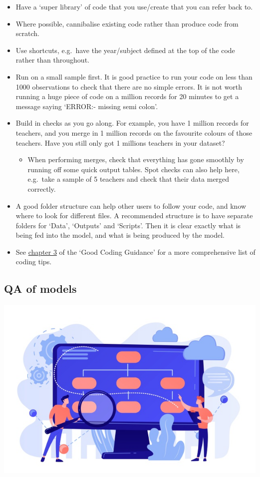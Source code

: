 \documentclass[
]{article}
\providecommand{\tightlist}{%
  \setlength{\itemsep}{0pt}\setlength{\parskip}{0pt}}
\begin{document}
\begin{itemize}
\item
  Have a `super library' of code that you use/create that you can refer back to.
\item
  Where possible, cannibalise existing code rather than produce code from scratch.
\item
  Use shortcuts, e.g.~have the year/subject defined at the top of the code rather than throughout.
\item
  Run on a small sample first. It is good practice to run your code on less than 1000 observations to check that there are no simple errors. It is not worth running a huge piece of code on a million records for 20 minutes to get a message saying `ERROR:- missing semi colon'.
\item
  Build in checks as you go along. For example, you have 1 million records for teachers, and you merge in 1 million records on the favourite colours of those teachers. Have you still only got 1 millions teachers in your dataset?

  \begin{itemize}
  \tightlist
  \item
    When performing merges, check that everything has gone smoothly by running off some quick output tables. Spot checks can also help here, e.g.~take a sample of 5 teachers and check that their data merged correctly.
  \end{itemize}
\item
  A good folder structure can help other users to follow your code, and know where to look for different files. A recommended structure is to have separate folders for `Data', `Outputs' and `Scripts'. Then it is clear exactly what is being fed into the model, and what is being produced by the model.
\item
  See \href{https://dfe-analytical-services.github.io/good-code-practice/fundamentals.html}{chapter 3} of the `Good Coding Guidance' for a more comprehensive list of coding tips.
\end{itemize}

\hypertarget{qa-of-models}{%
\subsection{QA of models}\label{qa-of-models}}

\includegraphics{pictures/modelling_pic.jpg}
\end{document}

